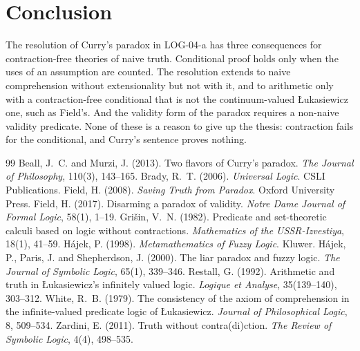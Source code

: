 \documentclass{situationist-preprint}
\begin{document}
\section{Conclusion}

The resolution of Curry's paradox in LOG-04-a has three consequences for contraction-free theories of naive truth. Conditional proof holds only when the uses of an assumption are counted. The resolution extends to naive comprehension without extensionality but not with it, and to arithmetic only with a contraction-free conditional that is not the continuum-valued Łukasiewicz one, such as Field's. And the validity form of the paradox requires a non-naive validity predicate. None of these is a reason to give up the thesis: contraction fails for the conditional, and Curry's sentence proves nothing.

\begin{thebibliography}{99}\small
{} Beall, J.~C. and Murzi, J. (2013). Two flavors of Curry's paradox. \emph{The Journal of Philosophy}, 110(3), 143--165.
 Brady, R.~T. (2006). \emph{Universal Logic}. CSLI Publications.
 Field, H. (2008). \emph{Saving Truth from Paradox}. Oxford University Press.
 Field, H. (2017). Disarming a paradox of validity. \emph{Notre Dame Journal of Formal Logic}, 58(1), 1--19.
 Gri\v{s}in, V.~N. (1982). Predicate and set-theoretic calculi based on logic without contractions. \emph{Mathematics of the USSR-Izvestiya}, 18(1), 41--59.
 H\'ajek, P. (1998). \emph{Metamathematics of Fuzzy Logic}. Kluwer.
 H\'ajek, P., Paris, J. and Shepherdson, J. (2000). The liar paradox and fuzzy logic. \emph{The Journal of Symbolic Logic}, 65(1), 339--346.
 Restall, G. (1992). Arithmetic and truth in Łukasiewicz's infinitely valued logic. \emph{Logique et Analyse}, 35(139--140), 303--312.
 White, R.~B. (1979). The consistency of the axiom of comprehension in the infinite-valued predicate logic of Łukasiewicz. \emph{Journal of Philosophical Logic}, 8, 509--534.
 Zardini, E. (2011). Truth without contra(di)ction. \emph{The Review of Symbolic Logic}, 4(4), 498--535.
\end{thebibliography}
\end{document}
